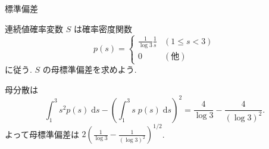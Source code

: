 \makeatletter  
{}%
\makeatother

 \begin{theme}{標準偏差}
   \begin{memo}
   \end{memo}
  \begin{prob}
連続値確率変数 $S$ は確率密度関数
    \begin{equation*}
      p(s)=
      \begin{cases}
        \frac{1}{\log 3}\frac1s& (1\leq s <3)\\
        0               & (\text{他})
      \end{cases}
    \end{equation*}
に従う. $S$ の母標準偏差を求めよう.
  \end{prob}
  \begin{sol}
母分散は
    \begin{equation*}
    \int_1^3 s^2p(s)\;\mathrm{d} s-
\left(    \int_1^3 s\; p(s)\;\mathrm{d} s\right)^2=\frac{4}{\log3}-\frac{4}{(\log3)^2}.
    \end{equation*}
よって母標準偏差は $2(\frac{1}{\log3}-\frac{1}{(\log3)^2})^{1/2}$.
  \end{sol}
\end{theme}

\makeatletter
{}
\makeatother

